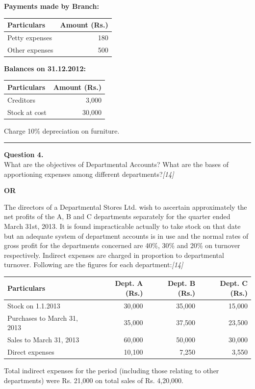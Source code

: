 \documentclass[11pt,a4paper]{article}
\newcommand{\pts}[1]{\hfill   \textit{[#1]}}
\begin{document}
   \textbf{Payments made by Branch:}

\begin{center}
\renewcommand{\arraystretch}{1.2}

\begin{tabular}{|l|r|}
\hline
   \textbf{Particulars} &   \textbf{Amount (Rs.)} \\ \hline
Petty expenses & 180 \\
Other expenses & 500 \\ \hline
\end{tabular}
\end{center}

   \textbf{Balances on 31.12.2012:}

\begin{center}
\renewcommand{\arraystretch}{1.2}

\begin{tabular}{|l|r|}
\hline
   \textbf{Particulars} &   \textbf{Amount (Rs.)} \\ \hline
Creditors & 3,000 \\
Stock at cost & 30,000 \\ \hline
\end{tabular}
\end{center}
Charge 10\% depreciation on furniture.

\medskip\rule{\linewidth}{0.2pt}




\noindent   \textbf{Question 4.} \\
What are the objectives of Departmental Accounts? What are the bases of apportioning expenses among different departments?\pts{14}

\centerline{   \textbf{OR}}

The directors of a Departmental Stores Ltd. wish to ascertain approximately the net profits of the A, B and C departments separately for the quarter ended March 31st, 2013. It is found impracticable actually to take stock on that date but an adequate system of department accounts is in use and the normal rates of gross profit for the departments concerned are 40\%, 30\% and 20\% on turnover respectively. Indirect expenses are charged in proportion to departmental turnover. Following are the figures for each department:\pts{14}

\begin{center}
\renewcommand{\arraystretch}{1.2}

\begin{tabular}{|l|r|r|r|}
\hline
   \textbf{Particulars} &   \textbf{Dept. A (Rs.)} &   \textbf{Dept. B (Rs.)} &   \textbf{Dept. C (Rs.)} \\ \hline
Stock on 1.1.2013 & 30,000 & 35,000 & 15,000 \\
Purchases to March 31, 2013 & 35,000 & 37,500 & 23,500 \\
Sales to March 31, 2013 & 60,000 & 50,000 & 30,000 \\
Direct expenses & 10,100 & 7,250 & 3,550 \\ \hline
\end{tabular}
\end{center}
Total indirect expenses for the period (including those relating to other departments) were Rs. 21,000 on total sales of Rs. 4,20,000.
\end{document}
